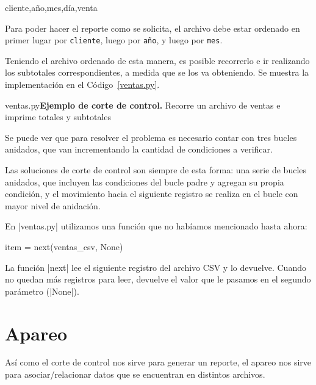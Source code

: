 \begin{codigo-nohl-sn}
cliente,año,mes,día,venta
\end{codigo-nohl-sn}

Para poder hacer el reporte como se solicita, el archivo debe estar ordenado en
primer lugar por \verb!cliente!, luego por \verb!año!, y luego por \verb!mes!.

Teniendo el archivo ordenado de esta manera, es posible recorrerlo e ir
realizando los subtotales correspondientes, a medida que se los va
obteniendo. Se muestra la implementación en el Código~\ref{ventas.py}.

\begin{codigo}{ventas.py}{{\bf Ejemplo de corte de control.} Recorre un archivo
	de ventas e imprime totales y subtotales}
\label{ventas.py}

\end{codigo}

Se puede ver que para resolver el problema es necesario contar con tres
bucles anidados, que van incrementando la cantidad de condiciones a
verificar.

\begin{observacion}
Las soluciones de corte de control son siempre de esta forma: una serie de
bucles anidados, que incluyen las condiciones del bucle padre y agregan su
propia condición, y el movimiento hacia el siguiente registro se realiza en
el bucle con mayor nivel de anidación.
\end{observacion}

\begin{nota}
En |ventas.py| utilizamos una función que no habíamos mencionado hasta ahora:

\begin{codigo-nohl-sn}
item = next(ventas_csv, None)
\end{codigo-nohl-sn}

La función |next| lee el siguiente registro del archivo CSV y lo devuelve.
Cuando no quedan más registros para leer, devuelve el valor que le pasamos en
el segundo parámetro (|None|).
\end{nota}

\section{Apareo}

Así como el corte de control nos sirve para generar un reporte, el apareo nos
sirve para asociar/relacionar datos que se encuentran en distintos archivos.

